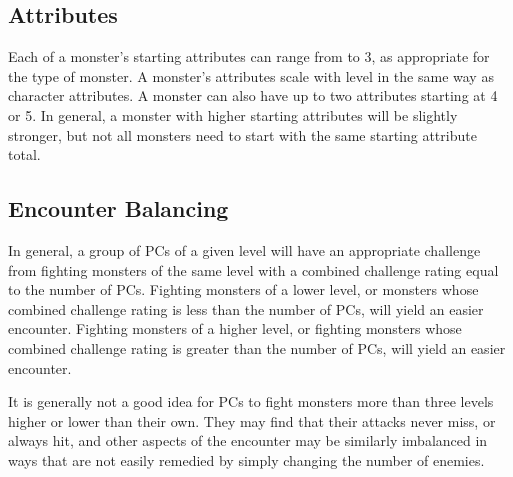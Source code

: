     \subsection{Attributes}
        Each of a monster's starting attributes can range from  to 3, as appropriate for the type of monster.
        A monster's attributes scale with level in the same way as character attributes.
        A monster can also have up to two attributes starting at 4 or 5.
        In general, a monster with higher starting attributes will be slightly stronger, but not all monsters need to start with the same starting attribute total.

    \subsection{Encounter Balancing}
        In general, a group of PCs of a given level will have an appropriate challenge from fighting monsters of the same level with a combined challenge rating equal to the number of PCs.
        Fighting monsters of a lower level, or monsters whose combined challenge rating is less than the number of PCs, will yield an easier encounter.
        Fighting monsters of a higher level, or fighting monsters whose combined challenge rating is greater than the number of PCs, will yield an easier encounter.

        It is generally not a good idea for PCs to fight monsters more than three levels higher or lower than their own.
        They may find that their attacks never miss, or always hit, and other aspects of the encounter may be similarly imbalanced in ways that are not easily remedied by simply changing the number of enemies.


